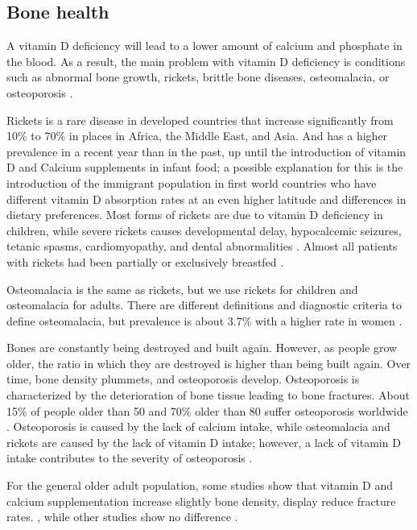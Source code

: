 \subsection{Bone health}

A vitamin D deficiency will lead to a lower amount of calcium and phosphate in the blood. As a result, the main problem with vitamin D deficiency is conditions such as abnormal bone growth, rickets, brittle bone diseases, osteomalacia, or osteoporosis \cite{ref:Elder2014}.

Rickets is a rare disease in developed countries that increase significantly from 10\% to 70\% in places in Africa, the Middle East, and Asia.\cite{ref:ricketstats} And has a higher prevalence in a recent year than in the past, up until the introduction of vitamin D and Calcium supplements in infant food\cite{ref:ricketstats, ref:Uday2017, ref:Munns2016}; a possible explanation for this is the introduction of the immigrant population in first world countries who have different vitamin D absorption rates at an even higher latitude and differences in dietary preferences. Most forms of rickets are due to vitamin D deficiency in children, while severe rickets causes developmental delay, hypocalcemic seizures, tetanic spasms, cardiomyopathy, and dental abnormalities \cite{ref:Uday2017, ref:Munns2016}. Almost all patients with rickets had been partially or exclusively breastfed \cite{ref:Uday2017, ref:Thacher2013}.

Osteomalacia is the same as rickets, but we use rickets for children and osteomalacia for adults. There are different definitions and diagnostic criteria to define osteomalacia, but prevalence is about 3.7\% with a higher rate in women \cite{ref:CAMPBELL1984}.

Bones are constantly being destroyed and built again. However, as people grow older, the ratio in which they are destroyed is higher than being built again. Over time, bone density plummets, and osteoporosis develop. Osteoporosis is characterized by the deterioration of bone tissue leading to bone fractures. About 15\% of people older than 50 and 70\% older than 80 suffer osteoporosis worldwide \cite{ref:osteoporisisstats}. Osteoporosis is caused by the lack of calcium intake, while osteomalacia and rickets are caused by the lack of vitamin D intake; however, a lack of vitamin D intake contributes to the severity of osteoporosis \cite{ref:1_Institute_of_Medicine2011-zg}.

For the general older adult population, some studies show that vitamin D and calcium supplementation increase slightly bone density, display reduce fracture rates. \cite{ref:Chung2009-wl, ref:1_Institute_of_Medicine2011-zg, ref:Yao2019, ref:Bouillon2021}, while other studies show no difference \cite{ref:Kahwati2018, ref:AMADavid2018, ref:Gallagher2018, ref:Bolland2018, ref:AMAGrossman2018, ref:GuirguisBlake2018, ref:LeBoff2022, ref:Bouillon2021} . \vspace{3 mm}

